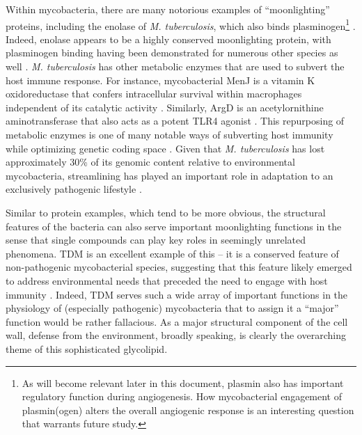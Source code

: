 Within mycobacteria, there are many notorious examples of ``moonlighting'' proteins, including the enolase of \textit{M. tuberculosis}, which also binds plasminogen\footnote{As will become relevant later in this document, plasmin also has important regulatory function during angiogenesis. How mycobacterial engagement of plasmin(ogen) alters the overall angiogenic response is an interesting question that warrants future study.} \citep{Rahi2017}. Indeed, enolase appears to be a highly conserved moonlighting protein, with plasminogen binding having been demonstrated for numerous other species as well \citep{Figueiredo2015, Seweryn2007, Candela2009, Floden2011, Vanegas2007, Agarwal2008}. \textit{M. tuberculosis} has other metabolic enzymes that are used to subvert the host immune response. For instance, mycobacterial MenJ is a vitamin K oxidoreductase that confers intracellular survival within macrophages independent of its catalytic activity \citep{Kumar2020b}. Similarly, ArgD is an acetylornithine aminotransferase that also acts as a potent TLR4 agonist \citep{Nehvi2022}. This repurposing of metabolic enzymes is one of many notable ways of subverting host immunity while optimizing genetic coding space \citep{Banerjee2004, Banerjee2007, Henderson2010}. Given that \textit{M. tuberculosis} has lost approximately 30\% of its genomic content relative to environmental mycobacteria, streamlining has played an important role in adaptation to an exclusively pathogenic lifestyle \citep{Stinear2008}. 

Similar to protein examples, which tend to be more obvious, the structural features of the bacteria can also serve important moonlighting functions in the sense that single compounds can play key roles in seemingly unrelated phenomena. TDM is an excellent example of this -- it is a conserved feature of non\hyp{}pathogenic mycobacterial species, suggesting that this feature likely emerged to address environmental needs that preceded the need to engage with host immunity \citep{Kremer2002, Pacheco2013}. Indeed, TDM serves such a wide array of important functions in the physiology of (especially pathogenic) mycobacteria that to assign it a ``major'' function would be rather fallacious. As a major structural component of the cell wall, defense from the environment, broadly speaking, is clearly the overarching theme of this sophisticated glycolipid. 

